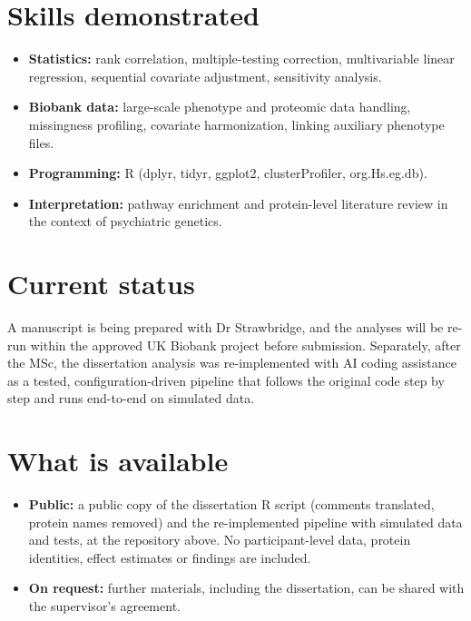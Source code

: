 \documentclass[10.5pt]{article}
\begin{document}
\section{Skills demonstrated}
\begin{itemize}
  \item \textbf{Statistics:} rank correlation, multiple-testing correction, multivariable linear regression,
        sequential covariate adjustment, sensitivity analysis.
  \item \textbf{Biobank data:} large-scale phenotype and proteomic data handling, missingness profiling,
        covariate harmonization, linking auxiliary phenotype files.
  \item \textbf{Programming:} R (dplyr, tidyr, ggplot2, clusterProfiler, org.Hs.eg.db).
  \item \textbf{Interpretation:} pathway enrichment and protein-level literature review in the context of
        psychiatric genetics.
\end{itemize}

\section{Current status}
A manuscript is being prepared with Dr Strawbridge, and the analyses will be re-run within the approved
UK Biobank project before submission. Separately, after the MSc, the dissertation analysis was re-implemented
with AI coding assistance as a tested, configuration-driven pipeline that follows the original code step by step
and runs end-to-end on simulated data.

\section{What is available}
\begin{itemize}
  \item \textbf{Public:} a public copy of the dissertation R script (comments translated, protein names
        removed) and the re-implemented pipeline with simulated data and tests, at the repository above. No
        participant-level data, protein identities, effect estimates or findings are included.
  \item \textbf{On request:} further materials, including the dissertation, can be shared with the
        supervisor's agreement.
\end{itemize}
\end{document}
